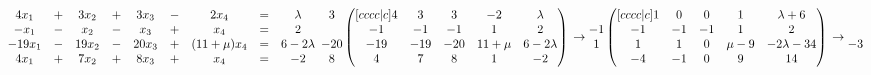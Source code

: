 \documentclass{article}
\begin{document}
    \begin{math}
        \begin{matrix}
          4x_1 & + & 3x_2 & + & 3x_3 & - & 2x_4 & = & \lambda\\
          -x_1 & - & x_2 & - & x_3 & + & x_4 & = & 2\\
          -19x_1 & - & 19x_2 & - & 20x_3 & + & (11 + \mu)x_4 & = & 6 - 2\lambda\\
          4x_1 & + & 7x_2 & + & 8x_3 & + & x_4 & = & -2
        \end{matrix}\\
        \\
        \\
        \begin{matrix}
          3\\
          ~\\
          -20\\
          8
        \end{matrix}
        \begin{pmatrix}[cccc|c]
            4 & 3 & 3 & -2 &  \lambda\\
            -1  &  -1 &  -1 & 1 & 2\\
            -19 & -19 & -20 & 11 + \mu & 6 - 2\lambda\\
            4 & 7 & 8 & 1 & -2
        \end{pmatrix}\\
        \\
        \\
        \to
        \begin{matrix}
          ~\\
          -1\\
          1\\
          ~
        \end{matrix}
        \begin{pmatrix}[cccc|c]
            1 & 0 & 0 & 1 & \lambda + 6\\
            -1 & -1 & -1 & 1 & 2\\
            1 & 1 & 0 & \mu - 9 & -2\lambda - 34\\
            -4 & -1 & 0 & 9 & 14
        \end{pmatrix}\\
        \\
        \\
        \to
        \begin{matrix}
          ~\\
          -3\\

\end{matrix}
\end{math}
\end{document}
